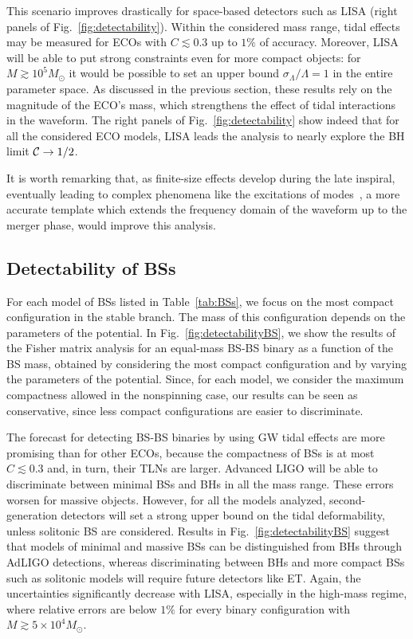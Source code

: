 \documentclass[aps,twocolumn,showpacs,preprintnumbers,nofootinbib,prd,superscriptaddress,groupedaddress,10pt]{revtex4-1}
\begin{document}
This scenario improves drastically for space-based detectors such as LISA (right panels of Fig.~\ref{fig:detectability}). Within the considered mass range, tidal effects may be measured for ECOs with ${C}\lesssim 0.3$ up to $1\%$ of accuracy. 
Moreover, LISA will be able to put strong constraints even for more compact objects: for $M\gtrsim 10^5M_\odot$ 
it would be possible to set an upper bound $\sigma_\Lambda/\Lambda=1$ in the entire parameter space. As discussed in the previous 
section, these results rely on the magnitude of the ECO's mass, which strengthens the effect of tidal interactions 
in the waveform. The right panels of Fig.~\ref{fig:detectability} show indeed that for all the considered ECO models, 
LISA leads the analysis to nearly explore the BH limit ${\cal C}\rightarrow 1/2$.

It is worth remarking that, as finite-size effects develop during the late inspiral, eventually leading to complex 
phenomena like the excitations of modes~\cite{Steinhoff:2016rfi}, a more accurate 
template which extends the frequency domain of the waveform up to the merger phase, 
would improve this analysis. 



\subsection{Detectability of BSs}

For each model of BSs listed in Table~\ref{tab:BSs}, we focus on the most compact configuration in the stable branch. The mass of this configuration depends on the parameters of the potential. In Fig.~\ref{fig:detectabilityBS}, we show the results of the Fisher matrix analysis for an equal-mass BS-BS binary as a function of the BS mass, obtained by considering the most compact configuration and by varying the parameters of the potential. Since, for each model, we consider the maximum compactness allowed in the nonspinning case, our results can be seen as conservative, since less compact configurations are easier to discriminate.
%

The forecast for detecting BS-BS binaries by using GW tidal effects are more promising than for other ECOs, because the compactness of BSs is at most $C\lesssim 0.3$ and, in turn, their TLNs are larger. Advanced LIGO will be able to discriminate between minimal BSs and BHs in all the mass range. These errors 
worsen for massive objects. However, for all the models analyzed, second-generation detectors will set a strong 
upper bound on the tidal deformability, unless solitonic BS are considered. 
Results in Fig.~\ref{fig:detectabilityBS} suggest that models of minimal and massive BSs can be distinguished from BHs through AdLIGO detections, whereas discriminating between BHs and more compact BSs such as solitonic models will require future detectors like ET. 
Again, the uncertainties significantly decrease with LISA, especially in the high-mass regime, where relative errors are below 
$1\%$ for every binary  configuration with $M\gtrsim 5\times 10^4M_\odot$. 
\end{document}
